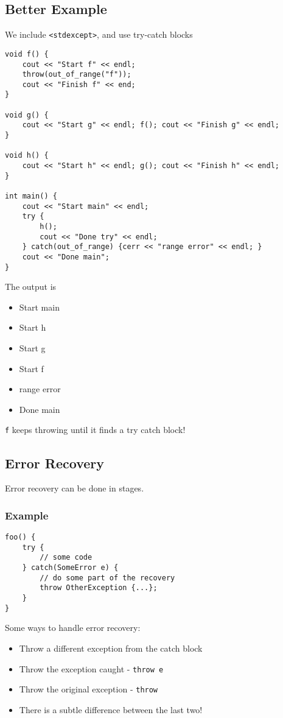 \documentclass[12pt]{article}
\begin{document}
\subsection{Better Example}
We include \lstinline{<stdexcept>}, and use try-catch blocks
\begin{lstlisting}
void f() {
    cout << "Start f" << endl;
    throw(out_of_range("f"));
    cout << "Finish f" << end;
}

void g() {
    cout << "Start g" << endl; f(); cout << "Finish g" << endl;
}

void h() {
    cout << "Start h" << endl; g(); cout << "Finish h" << endl;
}

int main() {
    cout << "Start main" << endl;
    try {
        h();
        cout << "Done try" << endl;
    } catch(out_of_range) {cerr << "range error" << endl; }
    cout << "Done main";
}
\end{lstlisting}
The output is
\begin{itemize}
    \item Start main
    \item Start h
    \item Start g
    \item Start f
    \item range error
    \item Done main
\end{itemize}
\lstinline{f} keeps throwing until it finds a try catch block!
\subsection{Error Recovery}
Error recovery can be done in stages.
\subsubsection{Example}
\begin{lstlisting}
foo() {
    try {
        // some code
    } catch(SomeError e) {
        // do some part of the recovery
        throw OtherException {...};
    }
}
\end{lstlisting}
Some ways to handle error recovery:
\begin{itemize}
    \item Throw a different exception from the catch block
    \item Throw the exception caught - \lstinline{throw e}
    \item Throw the original exception - \lstinline{throw}
    \item There is a subtle difference between the last two! %
\end{itemize}
\end{document}
